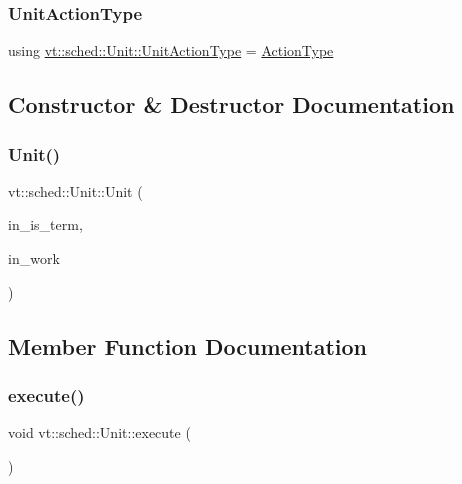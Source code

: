 \subsubsection{\texorpdfstring{Unit\+Action\+Type}{UnitActionType}}
{\footnotesize\ttfamily using \hyperlink{structvt_1_1sched_1_1_unit_a94de9219796a6b3134e5f6f87cc017d8}{vt\+::sched\+::\+Unit\+::\+Unit\+Action\+Type} =  \hyperlink{namespacevt_ae0a5a7b18cc99d7b732cb4d44f46b0f3}{Action\+Type}}



\subsection{Constructor \& Destructor Documentation}
\mbox{\label{structvt_1_1sched_1_1_unit_a7445ffcd3650520b912134ab8f2213b8}} 
\subsubsection{\texorpdfstring{Unit()}{Unit()}}
{\footnotesize\ttfamily vt\+::sched\+::\+Unit\+::\+Unit (\begin{DoxyParamCaption}\item[{bool}]{in\+\_\+is\+\_\+term,  }\item[{\hyperlink{structvt_1_1sched_1_1_unit_a94de9219796a6b3134e5f6f87cc017d8}{Unit\+Action\+Type}}]{in\+\_\+work }\end{DoxyParamCaption})\hspace{0.3cm}{\ttfamily [inline]}}



\subsection{Member Function Documentation}
\mbox{\label{structvt_1_1sched_1_1_unit_abb9552d5ca05e00ea19b8d3097ad01d9}} 
\subsubsection{\texorpdfstring{execute()}{execute()}}
{\footnotesize\ttfamily void vt\+::sched\+::\+Unit\+::execute (\begin{DoxyParamCaption}{ }\end{DoxyParamCaption})\hspace{0.3cm}{\ttfamily [inline]}}

